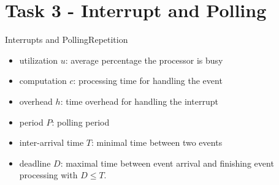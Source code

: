 
\section{Task 3 - Interrupt and Polling}

\begin{frame}{Interrupts and Polling}{Repetition}
  \begin{itemize}
    \item \alert{utilization $u$:} average percentage the processor is busy
    \item \alert{computation $c$:} processing time for handling the event
    \item \alert{overhead $h$:} time overhead for handling the interrupt
    \item \alert{period $P$:} polling period
    \item \alert{inter-arrival time $T$:} minimal time between two events
    \item \alert{deadline $D$:} maximal time between event arrival and finishing event processing with $D \le T$.
  \end{itemize}
\end{frame}

